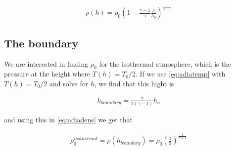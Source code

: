 \documentclass[a4paper, 10pt]{article}
\begin{document}
\begin{align}\label{eq:adiadens}
\rho (h) = \rho_0 \left(1-\frac{\gamma - 1}{\gamma} \frac{h}{h_0}\right)^{\frac{1}{\gamma - 1}}
\end{align}

\subsection{The boundary}
We are interested in finding $\rho_0$ for the isothermal atmosphere, which is the pressure at the height where $T(h) = T_0/2$. If we use \ref{eq:adiatemp} with  $T(h) = T_0/2$ and solve for $h$, we find that this hight is

\begin{align}
h_{boundary} = \frac{\gamma}{2(\gamma -1)}h_o
\end{align}

and using this in \ref{eq:adiadens} we get that 

\begin{align}
\rho_0^{isothermal} = \rho(h_{boundary}) = \rho_0 \left(\frac{1}{2} \right) ^{\frac{1}{\gamma +1}}
\end{align}


 

\end{document}
